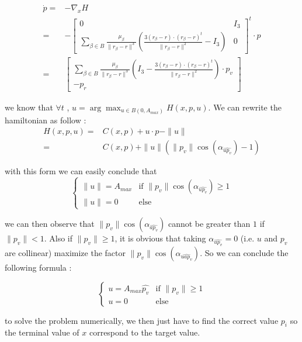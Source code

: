 \documentclass{article} %
\begin{document}
{			$$
			\begin{align}
				\dot{p}=&-\nabla _{x}H\\
				=&-\begin{bmatrix}
					0 & I_3\\
					\sum\limits _{\beta \in B }\frac{\mu _{\beta }}{\| r_{\beta } -r\| ^{3}}\left(\frac{3( r_{\beta } -r) \cdot ( r_{\beta } -r)^{t}}{\| r_{\beta } -r\| ^{2}} -I_3\right) & 0
				\end{bmatrix}^{t} \cdot p\\
				=&\begin{bmatrix}
					\sum\limits _{\beta \in B }\frac{\mu _{\beta }}{\| r_{\beta } -r\| ^{3}}\left(I_3-\frac{3( r_{\beta } -r) \cdot ( r_{\beta } -r)^{t}}{\| r_{\beta } -r\| ^{2}} \right)\cdot p_v\\
					-p_r
				\end{bmatrix}
			\end{align}
			$$
			
			we know that $\forall t$ , $u=\arg\max_{u\in B(0,A_{max})}H(x,p,u)$. We can rewrite the hamiltonian as follow : 
			$$
			\begin{align}
				H(x,p,u)=&C(x,p)+u\cdot p-\|u\| \\
				=&C(x,p)+\|u\|(\|p_v\|\cos(\alpha_{\widehat{up_v}})-1)
			\end{align}
			$$ 
			
			with this form we can easily conclude that 
			$$
			\begin{cases}
				\| u\| =A_{max} & \text{if } \|p_v\|\cos(\alpha_{\widehat{up_v}})\ge1\\
				\| u\| =0 & \text{else}
			\end{cases}
			$$
			
			we can then observe that $\|p_v\|\cos(\alpha_{\widehat{ap_v}})$ cannot be greater than $1$ if $\|p_v\| < 1$. Also if $\|p_v\| \ge 1$, it is obvious that taking $\alpha_{\widehat{up_v}}=0$ (i.e. $u$ and $p_v$ are collinear) maximize the factor $\|p_v\|\cos(\alpha_{\widehat{uap_v}})$. So we can conclude the following formula :
			
			$$
			\begin{cases}
				 u =A_{max}\widehat{p_v} & \text{if }\|p_v\| \ge 1\\
				 u =0 & \text{else}
			\end{cases}
			$$
			
			to solve the problem numerically, we then just have to find the correct value $p_i$ so the terminal value of $x$ correspond to the target value.
			
}
\end{document}
